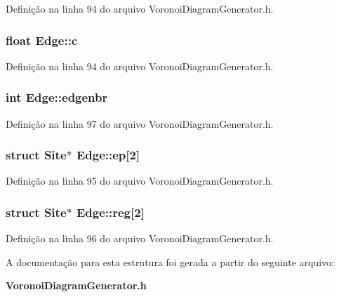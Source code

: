 Definição na linha 94 do arquivo Voronoi\+Diagram\+Generator.\+h.

\subsubsection[{c}]{\setlength{\rightskip}{0pt plus 5cm}float Edge\+::c}\label{struct_edge_a2619a927f43fc0623a9b78a726be1a69}


Definição na linha 94 do arquivo Voronoi\+Diagram\+Generator.\+h.

\subsubsection[{edgenbr}]{\setlength{\rightskip}{0pt plus 5cm}int Edge\+::edgenbr}\label{struct_edge_a2921d395965127558430ac6f0d5546dd}


Definição na linha 97 do arquivo Voronoi\+Diagram\+Generator.\+h.

\subsubsection[{ep}]{\setlength{\rightskip}{0pt plus 5cm}struct {\bf Site}$\ast$ Edge\+::ep[2]}\label{struct_edge_a905e296203dbbd5d5d76a6eda092bf11}


Definição na linha 95 do arquivo Voronoi\+Diagram\+Generator.\+h.

\subsubsection[{reg}]{\setlength{\rightskip}{0pt plus 5cm}struct {\bf Site}$\ast$ Edge\+::reg[2]}\label{struct_edge_a28cdc4cd3f522515907eb210de77b5dd}


Definição na linha 96 do arquivo Voronoi\+Diagram\+Generator.\+h.



A documentação para esta estrutura foi gerada a partir do seguinte arquivo\+:\begin{DoxyCompactItemize}
\item 
{\bf Voronoi\+Diagram\+Generator.\+h}\end{DoxyCompactItemize}
